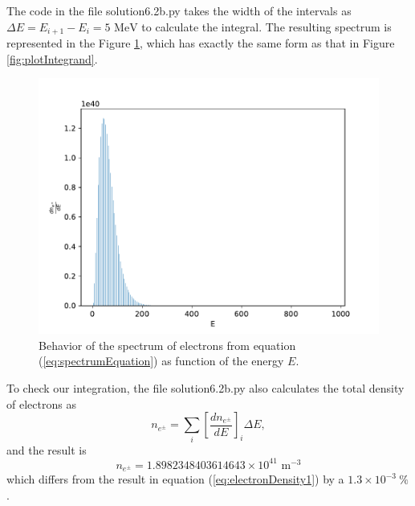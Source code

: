 \documentclass[11pt]{article}
\begin{document}
The code in the file solution6.2b.py takes the width of the intervals as $\Delta E = E_{i+1} - E_i = 5 \text{ MeV}$ to calculate the integral. The resulting spectrum is represented in the Figure \ref{fig:plotSpectrum}, which has exactly the same form as that in Figure \ref{fig:plotIntegrand}.
\begin{figure}
\centering
\includegraphics[scale=0.5]{plotSpectrum.pdf}
\caption{Behavior of the spectrum of electrons from equation (\ref{eq:spectrumEquation}) as function of the energy $E$.}
\label{fig:plotSpectrum}
\end{figure} 

To check our integration, the file solution6.2b.py also calculates the total density of electrons as
\begin{equation}
n_{e^\pm} = \sum_i \left[\frac{dn_{e^\pm}}{dE} \right]_i \Delta E,
\label{eq:spectrumEquation}
\end{equation}
and the result is 
\begin{equation}
n_{e^\pm} = 1.8982348403614643 \times 10^{41}  \text{ m}^{-3} \label{eq:electronDensity2}
\end{equation}
which  differs from the result in equation (\ref{eq:electronDensity1}) by a $1.3 \times 10^{-3} \ \%$ .
 
\end{document}
